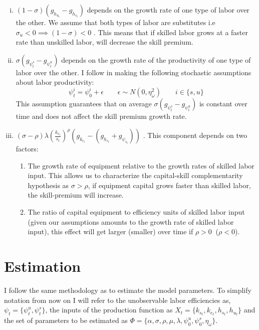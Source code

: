 \documentclass[12pt]{article}
\begin{document}
\begin{enumerate}[(i)]
 \item $(1-\sigma)(g_{h_{u_t}}-g_{h_{s_t}})$ depends on the growth rate of one type of labor over the other. We assume that both types of labor are substitutes i.e $\sigma_u < 0 \implies (1-\sigma) < 0$ . This means that if skilled labor grows at a faster rate than unskilled labor, will decrease the skill premium.
 \item $\sigma\left(g_{\psi^s_t}-g_{\psi^u_t}\right)$ depends on the growth rate of the productivity of one type of labor over the other. I follow \citep{krusell2000capital} in making the following stochastic assumptions about labor productivity:
 \begin{equation}\label{eq:stochastic_labor_productivity}
 \psi^i_t = \psi^i_0 + \epsilon \qquad \epsilon \sim N(0, \eta_\omega^2) \qquad i\in\{s,u\}
 \end{equation}
 This assumption guarantees that on average $\sigma (g_{\psi^s_t}-g_{\psi^u_t} )$ is constant over time and does not affect the skill premium growth rate. 
 \item $(\sigma-\rho) \lambda\left(\frac{k_{e_t}}{s_{t}}\right)^{\rho}\left(g_{k_{e_t}}-(g_{h_{s_t}}+g_{\psi_{s_t}})\right)$ . This component depends on two factors:
 \begin{enumerate}
 \item The growth rate of equipment relative to the growth rates of skilled labor input. This allows us to characterize the capital-skill complementarity hypothesis as $\sigma > \rho$, if equipment capital grows faster than skilled labor, the skill-premium will increase.
 \item The ratio of capital equipment to efficiency units of skilled labor input (given our assumptions amounts to the growth rate of skilled labor input), this effect will get larger (smaller) over time if $\rho > 0\:$ ($\rho < 0$). 
 \end{enumerate}
\end{enumerate}

\section{Estimation}
I follow the same methodology as \citep{krusell2000capital} to estimate the model parameters. To simplify notation from now on I will refer to the unobservable labor efficiencies as, $\psi_t = \{\psi^u_t, \psi^s_t\}$, the inputs of the production function as $X_t = \{ k_{s_t} , k_{e_t}, h_{s_t}, h_{u_t}\}$ and the set of parameters to be estimated as $\Phi = \{\alpha, \sigma, \rho, \mu, \lambda, \psi^u_0, \psi^s_0, \eta_\omega \}$. 
\end{document}
